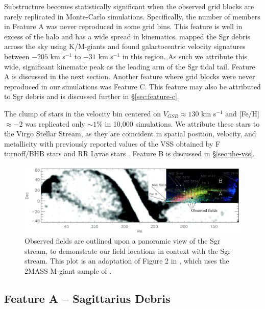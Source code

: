 \documentclass[preprint2]{aastex}
\begin{document}
	 Substructure becomes statistically significant when the observed grid blocks are rarely replicated in Monte-Carlo simulations. Specifically, the number of members in Feature A was never reproduced in some grid bins. This feature is well in excess of the halo and has a wide spread in kinematics. \citet{Chou;et-al_2007} mapped the Sgr debris across the sky using K/M-giants and found galactocentric velocity signatures between $-205$ km s$^{-1}$ to $-31$ km s$^{-1}$ in this region. As such we attribute this wide, significant kinematic peak as the leading arm of the Sgr tidal tail. Feature A is discussed in the next section. Another feature where grid blocks were never reproduced in our simulations was Feature C. This feature may also be attributed to Sgr debris and is discussed further in \S\ref{sec:feature-c}.
	 	
	 The clump of stars in the velocity bin centered on $V_{GSR} \approx 130$ km s$^{-1}$ and [Fe/H] $\approx -2$ was replicated only $\sim1$\% in 10,000 simulations. We attribute these stars to the Virgo Stellar Stream, as they are coincident in spatial position, velocity, and metallicity with previously reported values of the VSS obtained by F turnoff/BHB stars \citep{Newberg;et-al_2007} and RR Lyrae stars \citep{Prior;et-al_2009a}. Feature B is discussed in \S\ref{sec:the-vss}.

	\begin{figure}[t!]
		\includegraphics[width=\textwidth]{./adapted_belokurov_2006.eps}
		\caption{Observed fields are outlined upon a panoramic view of the Sgr stream, to demonstrate our field locations in context with the Sgr stream. This plot is an adaptation of Figure 2 in \citet{Belokurov;et-al_2006}, which uses the 2MASS M-giant sample of \citet{Majewski;et-al_2003}.}
		\label{fig:sgr-field-of-streams}
	\end{figure}
	
	\subsection{Feature A \--- Sagittarius Debris}
	\label{sec:sgr-debris}
	
\end{document}
